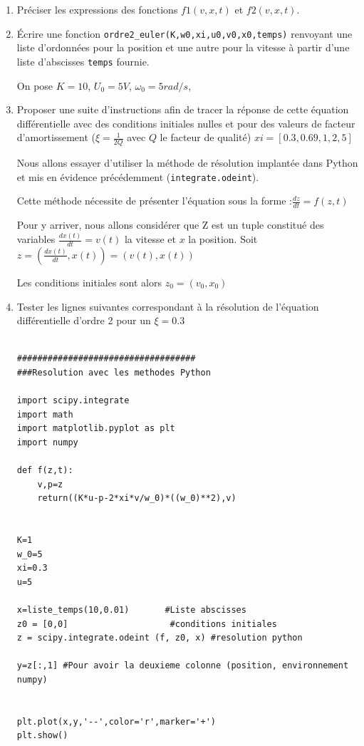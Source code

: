 \documentclass[10pt]{article}
\begin{document}
\begin{enumerate}
\item Pr\'eciser les expressions des fonctions $f1(v,x,t)$ et $f2(v,x,t)$.

\item \'Ecrire une fonction {\tt ordre2\_euler(K,w0,xi,u0,v0,x0,temps)} renvoyant une liste d'ordonn\'ees pour la position et une autre pour la vitesse \`a partir d'une liste d'abscisses {\tt temps} fournie.

On pose $K=10$, $U_0=5V$, $\omega_0=5 rad/s$, 

\item Proposer une suite d'instructions afin de tracer la r\'eponse de cette \'equation diff\'erentielle avec des conditions initiales nulles et pour des valeurs de facteur d'amortissement ($\xi=\frac{1}{2Q}$ avec $Q$ le facteur de qualit\'e) $xi=[0.3,0.69,1,2,5]$

Nous allons essayer d'utiliser la m\'ethode de r\'esolution implant\'ee dans Python et mis en \'evidence pr\'ec\'edemment ({\tt integrate.odeint}).

Cette m\'ethode n\'ecessite de pr\'esenter l'\'equation sous la forme :$\frac{dz}{dt}=f(z,t)$

Pour y arriver, nous allons consid\'erer que Z est un tuple constitu\'e des variables  $\frac{dx(t)}{dt}=v(t)$ la vitesse et $x$ la position. Soit $z=(\frac{dx(t)}{dt},x(t))=(v(t),x(t))$

Les conditions initiales sont alors $z_0=(v_0,x_0)$

\item Tester les lignes suivantes correspondant \`a la r\'esolution de l'\'equation diff\'erentielle d'ordre 2 pour un $\xi=0.3$
\begin{verbatim}

###################################
###Resolution avec les methodes Python

import scipy.integrate
import math
import matplotlib.pyplot as plt
import numpy

def f(z,t):
    v,p=z
    return((K*u-p-2*xi*v/w_0)*((w_0)**2),v)


K=1
w_0=5
xi=0.3
u=5
   
x=liste_temps(10,0.01)       #Liste abscisses
z0 = [0,0]                    #conditions initiales
z = scipy.integrate.odeint (f, z0, x) #resolution python

y=z[:,1] #Pour avoir la deuxieme colonne (position, environnement numpy)


plt.plot(x,y,'--',color='r',marker='+')
plt.show()  

\end{verbatim} 

\end{enumerate}
\end{document}
